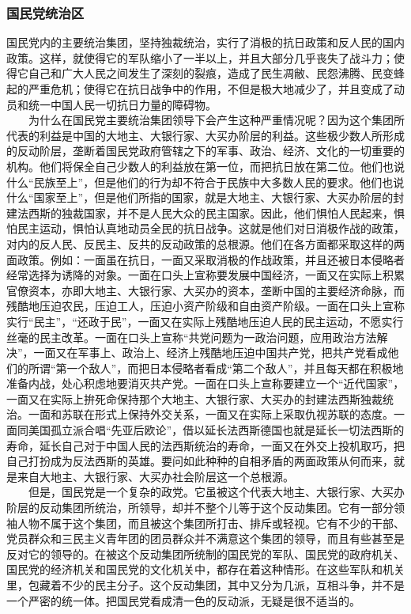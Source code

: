 \documentclass[cn,11pt,chinese]{elegantbook}
\def\myformat#1{\hfil\hfil #1}
\begin{document}
\subsubsection*{\myformat{国民党统治区}}
国民党内的主要统治集团，坚持独裁统治，实行了消极的抗日政策和反人民的国内政策。这样，就使得它的军队缩小了一半以上，并且大部分几乎丧失了战斗力；使得它自己和广大人民之间发生了深刻的裂痕，造成了民生凋敝、民怨沸腾、民变蜂起的严重危机；使得它在抗日战争中的作用，不但是极大地减少了，并且变成了动员和统一中国人民一切抗日力量的障碍物。\\
　　为什么在国民党主要统治集团领导下会产生这种严重情况呢？因为这个集团所代表的利益是中国的大地主、大银行家、大买办阶层的利益。这些极少数人所形成的反动阶层，垄断着国民党政府管辖之下的军事、政治、经济、文化的一切重要的机构。他们将保全自己少数人的利益放在第一位，而把抗日放在第二位。他们也说什么“民族至上”，但是他们的行为却不符合于民族中大多数人民的要求。他们也说什么“国家至上”，但是他们所指的国家，就是大地主、大银行家、大买办阶层的封建法西斯的独裁国家，并不是人民大众的民主国家。因此，他们惧怕人民起来，惧怕民主运动，惧怕认真地动员全民的抗日战争。这就是他们对日消极作战的政策，对内的反人民、反民主、反共的反动政策的总根源。他们在各方面都采取这样的两面政策。例如：一面虽在抗日，一面又采取消极的作战政策，并且还被日本侵略者经常选择为诱降的对象。一面在口头上宣称要发展中国经济，一面又在实际上积累官僚资本，亦即大地主、大银行家、大买办的资本，垄断中国的主要经济命脉，而残酷地压迫农民，压迫工人，压迫小资产阶级和自由资产阶级。一面在口头上宣称实行“民主”，“还政于民”，一面又在实际上残酷地压迫人民的民主运动，不愿实行丝毫的民主改革。一面在口头上宣称“共党问题为一政治问题，应用政治方法解决”，一面又在军事上、政治上、经济上残酷地压迫中国共产党，把共产党看成他们的所谓“第一个敌人”，而把日本侵略者看成“第二个敌人”，并且每天都在积极地准备内战，处心积虑地要消灭共产党。一面在口头上宣称要建立一个“近代国家”，一面又在实际上拚死命保持那个大地主、大银行家、大买办的封建法西斯独裁统治。一面和苏联在形式上保持外交关系，一面又在实际上采取仇视苏联的态度。一面同美国孤立派合唱“先亚后欧论”，借以延长法西斯德国也就是延长一切法西斯的寿命，延长自己对于中国人民的法西斯统治的寿命，一面又在外交上投机取巧，把自己打扮成为反法西斯的英雄。要问如此种种的自相矛盾的两面政策从何而来，就是来自大地主、大银行家、大买办社会阶层这一个总根源。\\
　　但是，国民党是一个复杂的政党。它虽被这个代表大地主、大银行家、大买办阶层的反动集团所统治，所领导，却并不整个儿等于这个反动集团。它有一部分领袖人物不属于这个集团，而且被这个集团所打击、排斥或轻视。它有不少的干部、党员群众和三民主义青年团的团员群众并不满意这个集团的领导，而且有些甚至是反对它的领导的。在被这个反动集团所统制的国民党的军队、国民党的政府机关、国民党的经济机关和国民党的文化机关中，都存在着这种情形。在这些军队和机关里，包藏着不少的民主分子。这个反动集团，其中又分为几派，互相斗争，并不是一个严密的统一体。把国民党看成清一色的反动派，无疑是很不适当的。\\
\end{document}
